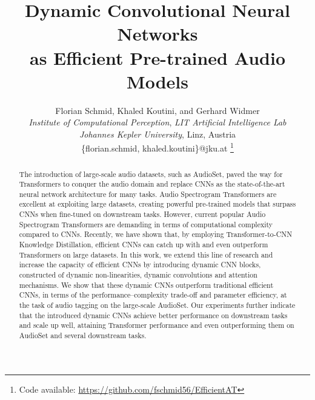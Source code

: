 \documentclass[lettersize,journal]{IEEEtran}
\begin{document}
\title{Dynamic Convolutional Neural Networks \\ as Efficient Pre-trained Audio Models}

\author{Florian Schmid, Khaled Koutini, and Gerhard Widmer \\
\textit{Institute of Computational Perception}, \textit{LIT Artificial Intelligence Lab}  \\
\textit{Johannes Kepler University}, Linz, Austria \\
\{florian.schmid, khaled.koutini\}@jku.at
\thanks{Code available: \href{https://github.com/fschmid56/EfficientAT}{https://github.com/fschmid56/EfficientAT}}
}


 



\maketitle

\begin{abstract}
The introduction of large-scale audio datasets, such as AudioSet, paved the way for Transformers to conquer the audio domain and replace CNNs as the state-of-the-art neural network architecture for many tasks. Audio Spectrogram Transformers are excellent at exploiting large datasets, creating powerful pre-trained models that surpass CNNs when fine-tuned on downstream tasks. However, current popular Audio Spectrogram Transformers are demanding in terms of computational complexity compared to CNNs. Recently, we have shown that, by employing Transformer-to-CNN Knowledge Distillation, efficient CNNs can catch up with and even outperform Transformers on large datasets. In this work, we extend this line of research and increase the capacity of efficient CNNs by introducing dynamic CNN blocks, constructed of dynamic non-linearities, dynamic convolutions and attention mechanisms. We show that these dynamic CNNs outperform traditional efficient CNNs, in terms of the performance--complexity trade-off and parameter efficiency, at the task of audio tagging on the large-scale AudioSet. Our experiments further indicate that the introduced dynamic CNNs achieve better performance on downstream tasks and scale up well, attaining Transformer performance and even outperforming them on AudioSet and several downstream tasks.  

\end{abstract}
\end{document}
